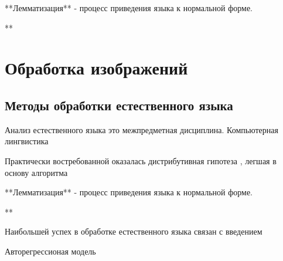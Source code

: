 **Лемматизация** - процесс приведения языка к нормальной форме.

**


\section{Обработка изображений}

\subsection{Методы обработки естественного языка}

Анализ естественного языка это межпредметная дисциплина.
Компьютерная лингвистика

Практически востребованной оказалась дистрибутивная гипотеза \cite{Schutze},
легшая в основу алгоритма \cite{NIPS2013_9aa42b31}


**Лемматизация** - процесс приведения языка к нормальной форме.

**


Наибольшей успех в обработке естественного языка связан с
введением 

Авторегрессионая модель

